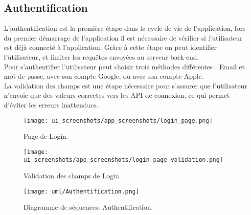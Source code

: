 \subsection{Authentification}
L'authentification est la première étape dans le cycle de vie de l'application, lors du premier démarrage de l'application il est nécessaire de vérifier si l'utilisateur est déjà connecté à l'application. Grâce à cette étape on peut identifier l'utilisateur, et limiter les requêtes envoyées au serveur back-end.\\
\noindent Pour s'authentifier l'utilisateur peut choisir trois méthodes différentes : Email et mot de passe, avec son compte Google, ou avec son compte Apple.\\
La validation des champs est une étape nécessaire pour s'assurer que l'utilisateur n'envoie que des valeurs correctes vers les API de connexion, ce qui permet d'éviter les erreurs inattendues.
\vspace{1cm}
\begin{center}
    \begin{multicols}{2}
        \begin{figure}[H]
            \centering
            \texttt{[image: ui\_screenshots/app\_screenshots/login\_page.png]}
            \vspace{1cm}
            \caption{Page de Login.}
            \label{fig:app_login}
        \end{figure}
        \begin{figure}[H]
            \centering
            \texttt{[image: ui\_screenshots/app\_screenshots/login\_page\_validation.png]}
            \vspace{1cm}
            \caption{Validation des champs de Login.}
            \label{fig:app_login_validation}
        \end{figure}
    \end{multicols}
\end{center}
\vspace{1cm}
\begin{figure}[H]
    \centering
    \texttt{[image: uml/Authentification.png]}
    \vspace{1cm}
    \caption{Diagramme de séquences: Authentification.}
    \label{fig:seq_auth}
\end{figure}
